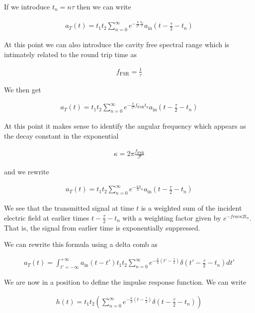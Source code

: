 \documentclass[12pt]{article}
\begin{document}
If we introduce $t_n = n \tau$ then we can write

\begin{align}
a_T(t) = t_1 t_2 \sum_{n=0}^{\infty} e^{-\frac{\pi}{\mathcal{F}}\frac{t_n}{\tau}} a_{\text{in}}\left(t-\frac{\tau}{2} - t_n\right)
\end{align}

At this point we can also introduce the cavity free spectral range which is intimately related to the round trip time as

\begin{align}
f_{\text{FSR}} = \frac{1}{\tau}
\end{align}

We then get

\begin{align}
a_T(t) = t_1 t_2 \sum_{n=0}^{\infty} e^{-\frac{\pi}{\mathcal{F}}f_{\text{FSR}}t_n} a_{\text{in}}\left(t-\frac{\tau}{2} - t_n\right)
\end{align}

At this point it makes sense to identify the angular frequency which appears as the decay constant in the exponential

\begin{align}
\kappa = 2\pi \frac{f_{\text{FSR}}}{\mathcal{F}}
\end{align}

and we rewrite

\begin{align}
a_T(t) = t_1 t_2 \sum_{n=0}^{\infty} e^{-\frac{\kappa}{2}t_n} a_{\text{in}}\left(t-\frac{\tau}{2} - t_n\right)
\end{align}

We see that the transmitted signal at time $t$ is a weighted sum of the incident electric field at earlier times $t-\frac{\tau}{2} - t_n$ with a weighting factor given by $e^{-frac{\kappa}{2}t_n}$. That is, the signal from earlier time is exponentially suppressed.

We can rewrite this formula using a delta comb as

\begin{align}
a_T(t) = \int_{t'=-\infty}^{+\infty} a_{\text{in}}(t-t') t_1t_2\sum_{n=0}^{\infty} e^{-\frac{\kappa}{2}\left(t'- \frac{\tau}{2}\right)}\delta\left(t'-\frac{\tau}{2}-t_n\right) dt'
\end{align}

We are now in a position to define the impulse response function. We can write

\begin{align}
h(t) = t_1t_2\left(\sum_{n=0}^{\infty}e^{-\frac{\kappa}{2}\left(t-\frac{\tau}{2}\right)} \delta\left(t - \frac{\tau}{2} - t_n\right) \right)
\end{align}
\end{document}
